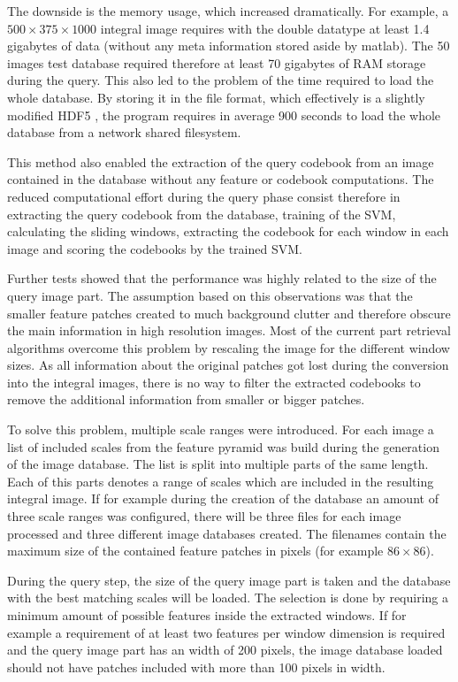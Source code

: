 The downside is the memory usage, which increased dramatically. For example, a $500 \times 375 \times 1000$ integral image requires with the double datatype at least 1.4 gigabytes of data (without any meta information stored aside by matlab). The 50 images test database required therefore at least 70 gigabytes of RAM storage during the query. This also led to the problem of the time required to load the whole database. By storing it in the  file format, which effectively is a slightly modified HDF5 \cite{hdf5}, the program requires in average 900 seconds to load the whole database from a network shared filesystem.

This method also enabled the extraction of the query codebook from an image contained in the database without any feature or codebook computations. The reduced computational effort during the query phase consist therefore in extracting the query codebook from the database, training of the \ac{SVM}, calculating the sliding windows, extracting the codebook for each window in each image and scoring the codebooks by the trained \ac{SVM}.

Further tests showed that the performance was highly related to the size of the query image part. The assumption based on this observations was that the smaller feature patches created to much background clutter and therefore obscure the main information in high resolution images. Most of the current part retrieval algorithms overcome this problem by rescaling the image for the different window sizes. As all information about the original patches got lost during the conversion into the integral images, there is no way to filter the extracted codebooks to remove the additional information from smaller or bigger patches.

To solve this problem, multiple scale ranges were introduced. For each image a list of included scales from the feature pyramid was build during the generation of the image database. The list is split into multiple parts of the same length. Each of this parts denotes a range of scales which are included in the resulting integral image. If for example during the creation of the database an amount of three scale ranges was configured, there will be three files for each image processed and three different image databases created. The filenames contain the maximum size of the contained feature patches in pixels (for example $86 \times 86$).

During the query step, the size of the query image part is taken and the database with the best matching scales will be loaded. The selection is done by requiring a minimum amount of possible features inside the extracted windows. If for example a requirement of at least two features per window dimension is required and the query image part has an width of 200 pixels, the image database loaded should not have patches included with more than 100 pixels in width.


